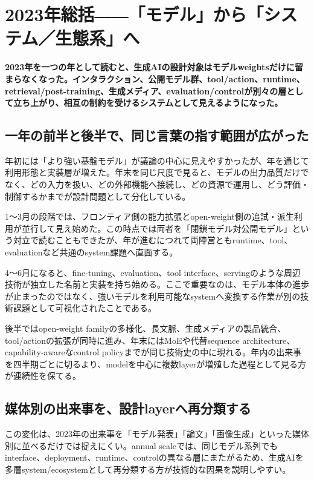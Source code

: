 \section{2023年総括――「モデル」から「システム／生態系」へ}
\label{pkg:annual-synthesis}
\noindent\textbf{2023年を一つの年として読むと、生成AIの設計対象はモデルweightsだけに留まらなくなった。インタラクション、公開モデル群、tool/action、runtime、retrieval/post-training、生成メディア、evaluation/controlが別々の層として立ち上がり、相互の制約を受けるシステムとして見えるようになった。}

\subsection{一年の前半と後半で、同じ言葉の指す範囲が広がった}

年初には「より強い基盤モデル」が議論の中心に見えやすかったが、年を通じて利用形態と実装層が増えた。年末を同じ尺度で見ると、モデルの出力品質だけでなく、どの入力を扱い、どの外部機能へ接続し、どの資源で運用し、どう評価・制御するかまでが設計問題として分化している。


1〜3月の段階では、フロンティア側の能力拡張とopen-weight側の追試・派生利用が並行して見え始めた。この時点では両者を「閉鎖モデル対公開モデル」という対立で読むこともできたが、年が進むにつれて両陣営ともruntime、tool、evaluationなど共通のsystem課題へ直面する。


4〜6月になると、fine-tuning、evaluation、tool interface、servingのような周辺技術が独立した名前と実装を持ち始める。ここで重要なのは、モデル本体の進歩が止まったのではなく、強いモデルを利用可能なsystemへ変換する作業が別の技術課題として可視化されたことである。


後半ではopen-weight familyの多様化、長文脈、生成メディアの製品統合、tool/actionの拡張が同時に進み、年末にはMoEや代替sequence architecture、capability-awareなcontrol policyまでが同じ技術史の中に現れる。年内の出来事を四半期ごとに切るより、modelを中心に複数layerが増殖した過程として見る方が連続性を保てる。


\subsection{媒体別の出来事を、設計layerへ再分類する}

この変化は、2023年の出来事を「モデル発表」「論文」「画像生成」といった媒体別に並べるだけでは捉えにくい。annual scaleでは、同じモデル系列でもinterface、deployment、runtime、controlの異なる層にまたがるため、生成AIを多層system/ecosystemとして再分類する方が技術的な因果を説明しやすい。


